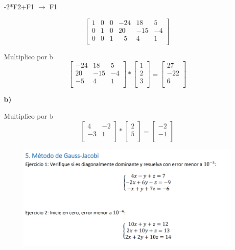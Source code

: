 \documentclass[12pt]{article}
\begin{document}
-2*F2+F1 $\longrightarrow $ F1

\[
\begin{bmatrix}
1 & 0 & 0 & -24& 18& 5\\
0 & 1 & 0 & 20& -15& -4\\
0 & 0& 1 & -5& 4& 1\\
\end{bmatrix}
\]

Multiplico por b
\[
\begin{bmatrix}
-24& 18& 5\\
20& -15& -4\\
-5& 4& 1\\
\end{bmatrix}
*
\begin{bmatrix}
1\\
2\\
3\\
\end{bmatrix}
=
\begin{bmatrix}
27\\
-22\\
6\\
\end{bmatrix}
\]

\textbf{b)}

Multiplico por b
\[
\begin{bmatrix}
4& -2\\
-3& 1\\
\end{bmatrix}
*
\begin{bmatrix}
2\\
5\\
\end{bmatrix}
=
\begin{bmatrix}
-2\\
-1\\
\end{bmatrix}
\]



\begin{figure}[H]
\includegraphics[width=1\textwidth]{./inFiles/Figures/Ej5.png}
\end{figure}
\end{document}

